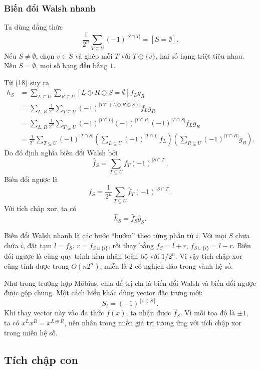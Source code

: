 \documentclass[11pt]{article}
\begin{document}
\subsubsection{Biến đổi Walsh nhanh}

Ta dùng đẳng thức
\[
  \frac{1}{2^n}\sum_{T\subseteq U}(-1)^{|S\cap T|}=[S=\emptyset]. \tag{21}
\]
Nếu \(S\ne\emptyset\), chọn \(v\in S\) và ghép mỗi \(T\) với \(T\oplus\{v\}\),
hai số hạng triệt tiêu nhau. Nếu \(S=\emptyset\), mọi số hạng đều bằng \(1\).

Từ (18) suy ra
\begin{align*}
  h_S
  &= \sum_{L\subseteq U}\sum_{R\subseteq U}
     [L\oplus R\oplus S=\emptyset] f_Lg_R \tag{22}\\
  &= \sum_{L,R}\frac{1}{2^n}\sum_{T\subseteq U}
     (-1)^{|T\cap(L\oplus R\oplus S)|} f_Lg_R \tag{23}\\
  &= \sum_{L,R}\frac{1}{2^n}\sum_{T\subseteq U}
     (-1)^{|T\cap L|}(-1)^{|T\cap R|}(-1)^{|T\cap S|} f_Lg_R \tag{24}\\
  &= \frac{1}{2^n}\sum_{T\subseteq U}(-1)^{|T\cap S|}
     \left(\sum_{L\subseteq U}(-1)^{|T\cap L|}f_L\right)
     \left(\sum_{R\subseteq U}(-1)^{|T\cap R|}g_R\right). \tag{25}
\end{align*}
Do đó định nghĩa biến đổi Walsh bởi
\[
  \hat f_S=\sum_{T\subseteq U} f_T(-1)^{|S\cap T|}. \tag{26}
\]
Biến đổi ngược là
\[
  f_S=\frac{1}{2^n}\sum_{T\subseteq U}\hat f_T(-1)^{|S\cap T|}. \tag{27}
\]
Với tích chập xor, ta có
\[
  \hat h_S=\hat f_S\hat g_S. \tag{28}
\]

Biến đổi Walsh nhanh là các bước ``bướm'' theo từng phần tử \(i\). Với mọi
\(S\) chưa chứa \(i\), đặt tạm \(l=f_S\), \(r=f_{S\cup\{i\}}\), rồi thay bằng
\(f_S=l+r\), \(f_{S\cup\{i\}}=l-r\). Biến đổi ngược là cùng quy trình kèm nhân
toàn bộ với \(1/2^n\). Vì vậy tích chập xor cũng tính được trong \(O(n2^n)\),
miễn là \(2\) có nghịch đảo trong vành hệ số.

Như trong trường hợp Möbius, chia để trị chỉ là biến đổi Walsh và biến đổi
ngược được gộp chung. Một cách hiểu khác dùng vector đặc trưng mới:
\[
  S_i=(-1)^{[i\in S]}. \tag{29}
\]
Khi thay vector này vào đa thức \(f(x)\), ta nhận được \(\hat f_S\). Vì mỗi tọa
độ là \(\pm1\), ta có \(x^Lx^R=x^{L\oplus R}\), nên nhân trong miền giá trị
tương ứng với tích chập xor trong miền hệ số.

\subsection{Tích chập con}
\end{document}
